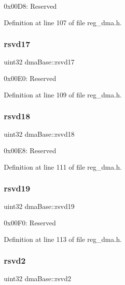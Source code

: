 0x00\+D8\+: Reserved 

Definition at line 107 of file reg\+\_\+dma.\+h.

\mbox{\label{structdmaBase_ae76dfa76af1ce767d6ac8f7cbfc58bcc}} 
\subsubsection{\texorpdfstring{rsvd17}{rsvd17}}
{\footnotesize\ttfamily uint32 dma\+Base\+::rsvd17}

0x00\+E0\+: Reserved 

Definition at line 109 of file reg\+\_\+dma.\+h.

\mbox{\label{structdmaBase_a0e5f84ff28e9b0c94238ef94b8548931}} 
\subsubsection{\texorpdfstring{rsvd18}{rsvd18}}
{\footnotesize\ttfamily uint32 dma\+Base\+::rsvd18}

0x00\+E8\+: Reserved 

Definition at line 111 of file reg\+\_\+dma.\+h.

\mbox{\label{structdmaBase_a576e7c8d85f058420e3196fb330d0570}} 
\subsubsection{\texorpdfstring{rsvd19}{rsvd19}}
{\footnotesize\ttfamily uint32 dma\+Base\+::rsvd19}

0x00\+F0\+: Reserved 

Definition at line 113 of file reg\+\_\+dma.\+h.

\mbox{\label{structdmaBase_a8226f5c62641386056dfb058f397108a}} 
\subsubsection{\texorpdfstring{rsvd2}{rsvd2}}
{\footnotesize\ttfamily uint32 dma\+Base\+::rsvd2}

